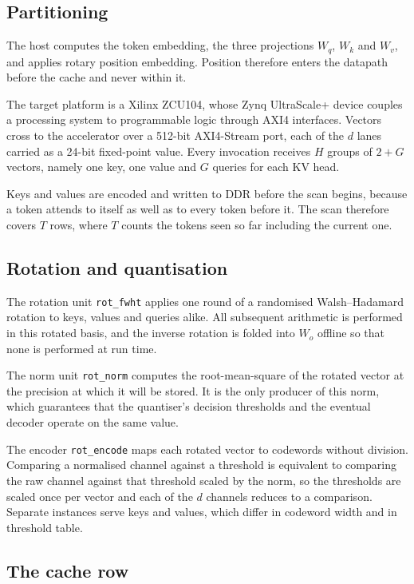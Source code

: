 \subsection{Partitioning}

The host computes the token embedding, the three projections $W_q$,
$W_k$ and $W_v$, and applies rotary position embedding. Position
therefore enters the datapath before the cache and never within it.

The target platform is a Xilinx ZCU104, whose Zynq UltraScale+ device
couples a processing system to programmable logic through AXI4
interfaces. Vectors cross to the accelerator over a 512-bit AXI4-Stream
port, each of the $d$ lanes carried as a 24-bit fixed-point value. Every
invocation receives $H$ groups of $2{+}G$ vectors, namely one key, one
value and $G$ queries for each KV head.

Keys and values are encoded and written to DDR before the scan begins,
because a token attends to itself as well as to every token before it.
The scan therefore covers $T$ rows, where $T$ counts the tokens seen so
far including the current one.

\subsection{Rotation and quantisation}

The rotation unit \texttt{rot\_fwht} applies one round of a randomised
Walsh--Hadamard rotation to keys, values and queries alike. All
subsequent arithmetic is performed in this rotated basis, and the
inverse rotation is folded into $W_o$ offline so that none is performed
at run time.

The norm unit \texttt{rot\_norm} computes the root-mean-square of the
rotated vector at the precision at which it will be stored. It is the
only producer of this norm, which guarantees that the quantiser's
decision thresholds and the eventual decoder operate on the same value.

The encoder \texttt{rot\_encode} maps each rotated vector to codewords
without division. Comparing a normalised channel against a threshold is
equivalent to comparing the raw channel against that threshold scaled by
the norm, so the thresholds are scaled once per vector and each of the
$d$ channels reduces to a comparison. Separate instances serve keys and
values, which differ in codeword width and in threshold table.

\subsection{The cache row}

